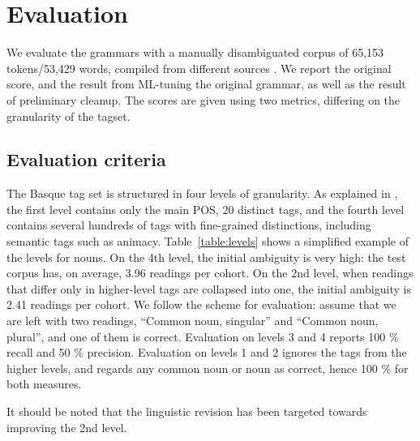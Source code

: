 \documentclass[11pt]{article}
\begin{document}
\section{Evaluation}

We evaluate the grammars with a manually disambiguated corpus of 65,153 tokens/53,429 words,
compiled from different sources \cite{aduriz2006epec}.
We report the original score, and the result from ML-tuning the original grammar, 
as well as the result of preliminary cleanup. 
The scores are given using two metrics, differing on the granularity of the tagset.

\subsection{Evaluation criteria}

The Basque tag set is structured in four levels of granularity. 
As explained in , the first level contains only the main POS, 20 distinct tags,
and the fourth level contains several hundreds of tags with fine-grained distinctions, including semantic tags such as animacy.
Table~\ref{table:levels} shows a simplified example of the levels for nouns.
On the 4th level, the initial ambiguity is very high: the test corpus has, on average,
3.96 readings per cohort. On the 2nd level, when readings that differ only in 
higher-level tags are collapsed into one, the initial ambiguity is 2.41 readings per cohort.
We follow the scheme for evaluation: assume that we are left with two readings, ``Common noun, singular''
and ``Common noun, plural'', and one of them is correct. Evaluation on levels 3 and 4 reports 100 \% recall and 50 \% precision.
Evaluation on levels 1 and 2 ignores the tags from the higher levels, and regards any common noun or noun as correct, hence 100 \% for both measures. 

It should be noted that the linguistic revision has been targeted
towards improving the 2nd level. 
\end{document}
